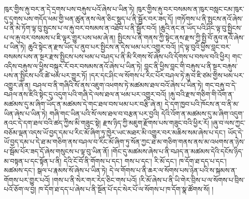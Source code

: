 ཁུར་གྱིས་རྐུ་བར་ན་དེ་དྲགས་པས་བརྐུས་པའོ་ཞེས་པ་ཡིན་ཏེ། ཁུར་གྱིས་རྐུ་བར་བསམས་ན་ཁུར་བསླང་ངམ་ཁུར་དུ་དྲགས་པས་གདོད་ཕམ་གྱི་ཕན་ཚུན་ནས་ལེན་ཅིང་སྡུད་པ་ནི་སྦྱོར་བར་ཟད་དོ། །གཏོགས་པ་ནི་སྤུངས་ནའོ་ཞེས་པ་ནི་མེ་ཏོག་ལྟ་བུ་སྤུངས་པ་ལ་རྐུ་བར་བསམས་ན་འཐོབ་པ་ནི་སྦྱོར་བའོ། །ཆུའི་ནང་ན་ཡོད་པའི་ཤིང་ལྟ་བུ་སྤྱིངས་པ་ལ་རྐུ་བར་བསམས་པ་ཇི་ལྟར་གྱུར་པས་ཕམ་ཞེ་ན། སྤྱིངས་པ་ནི་གནས་ཀྱི་སྟེང་ནས་རྫས་ཀྱི་སྤྱི་བོ་ནུབ་ནའོ་ཞེས་པ་ཡིན་ཏེ། ཆུའི་སྟེང་ན་རྫས་ཡོད་པ་ནུབ་པར་སྤྱིངས་ན་དེས་ཕམ་པར་འགྱུར་བའོ། །དེ་ལྟ་བུའི་ཕྱིས་བླང་བར་བསམས་པས་ན་སྔར་རྫས་སྤྱིངས་པས་ཕམ་པ་བཤད་པ་ནི་མི་རིགས་སོ་ཞེས་པའི་དོགས་པ་བསལ་བའི་ཕྱིར། གང་འདིས་བརྐུས་ལ་ཕྱིས་བསྐུར་རོ་བར་བསམས་ནའོ་ཞེས་པ་ཡིན་ཏེ། བླང་ནི་ཕྱིས་བླང་གི་བརྐུས་པ་ནི་སྔར་བརྐུས་པས་ན་སྤྱིངས་པའི་ཚེ་ཕམ་པར་གྱུར་ཏོ། །དར་དང་ཤིང་ལ་སོགས་པ་རིང་པོར་བཤལ་ཏེ་རྐུ་བ་ཇི་ཙམ་གྱིས་ཕམ་པར་འགྱུར་ཞེ་ན། བཤལ་བ་ནི་གཞིའི་སོ་ནས་འཇུག་འཕགས་ཏེ་མཚམས་ཐལ་བའོ་ཞེས་པ་ཡིན་ཏེ། གང་བརྐུ་བ་དེ་བཤལ་ནས་ཇིའི་སྟེང་དུ་འདུག་པའི་གཞི་དེ་ལས་ཐལ་ན་ཕམ་པར་འགྱུར་བའོ། །རྐུ་བའི་རྫས་གཅིག་གི་འོག་ན་མཚམས་དུ་མ་ཞིག་ཡོད་ན་མཚམས་དེ་གང་ཐལ་བས་ཕམ་པར་བརྩི་ཞེ་ན། དེ་དག་ཁྱབ་པའི་ཁོངས་ན་བ་ནི་མ་ཡིན་ཞེས་པ་ཡིན་ཏེ། གཞི་གང་ཡིན་པའི་སོ་ལས་ཐལ་བ་བརྩན་པར་བྱའི། དེའི་འོག་ན་མཚམས་དུ་མ་ཞིག་འདུག་ནའང་དེ་དག་ཐལ་བའི་ཚད་ཀྱིས་མི་གཟུང་སྟེ། རྫས་ཉིད་ཀྱི་མཇུག་རྫོགས་པས་གཟུང་བའི་ཕྱིར་རོ། །ཞུ་བ་ལས་ཀྱང་བཅོམ་ལྡན་འདས་ཡོ་བྱད་དམ་པ་རིང་མོ་ཞིག་ཏུ་ཁྱེར་ཡང་མཐར་མི་འགྱུར་བར་མཆིས་སམ་ཞེས་པ་དང་། ཡོད་དེ་ཡོ་བྱད་དམ་པ་དེ་ཐ་མ་གཅིག་ནས་བཤལ་བ་རིང་མོ་ཞིག་ཏུ་སོན་ཀྱང་ཐ་མ་གཅིག་གནས་ནས་མ་འཕགས་ན་ཉེས་པ་སྦོམ་པོར་ཟད་དོ་ཞེས་གསུངས་པ་ལྟ་བུ་ཡིན་ནོ། །གོང་དུ་མཚམས་ཞེས་པ་ནི་བཤད་ན་མཚམས་དེའི་དངོས་ཉིད་མ་བསྟན་པ་དང་སྟོན་པ་ནི། དེའི་ངོ་བོ་ནི་གོགས་པ་དང་། གས་པ་དང་། རི་མོ་དང་། ཁ་དོག་ཐ་དད་པ་དང་། མཚམས་དང་། སྒལ་པ་རྣམས་སོ་ཞེས་པ་ཡིན་ཏེ། དེ་ལ་གོགས་པ་ནི་ཆར་ལ་སོགས་པས་ཉེན་པའི་ས་སྐམས་ན་གོགས་པར་གྱུར་པའོ། །གས་པ་ནི་སེར་གར་རེད་ཅིང་གས་པའོ། །རི་མོ་ཞེས་པ་ནི་ཡི་གེར་བྲིས་པ་ལ་སོགས་པ་བྲིས་པའོ་ཅོག་ལ་བྱ། ཁ་དོག་ཐ་དད་པ་ཞེས་པ་ནི་སྔོན་པོ་དང་སེར་པོ་ལ་སོགས་པ་ཁ་དོག་སྣ་ཚོགས་སོ། །
